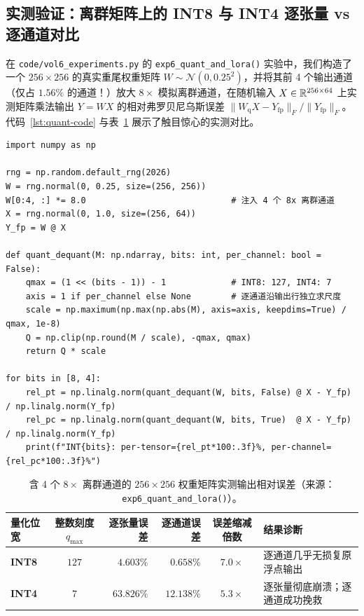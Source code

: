 \subsection{实测验证：离群矩阵上的 INT8 与 INT4 逐张量 vs 逐通道对比}

在 \texttt{code/vol6\_experiments.py} 的 \texttt{exp6\_quant\_and\_lora()} 实验中，我们构造了一个 $256 \times 256$ 的真实重尾权重矩阵 $W \sim \mathcal{N}(0, 0.25^2)$，并将其前 4 个输出通道（仅占 $1.56\%$ 的通道！）放大 $8\times$ 模拟离群通道，在随机输入 $X \in \mathbb{R}^{256\times 64}$ 上实测矩阵乘法输出 $Y = W X$ 的相对弗罗贝尼乌斯误差 $\|W_{\mathrm{q}} X - Y_{\mathrm{fp}}\|_F / \|Y_{\mathrm{fp}}\|_F$。代码~\ref{lst:quant-code} 与表~\ref{tab:quant-exp} 展示了触目惊心的实测对比。

\begin{lstlisting}[caption={对称均匀量化（逐张量 vs 逐通道）在重尾离群权重矩阵上的实测核验脚本。},label={lst:quant-code}]
import numpy as np

rng = np.random.default_rng(2026)
W = rng.normal(0, 0.25, size=(256, 256))
W[0:4, :] *= 8.0                             # 注入 4 个 8x 离群通道
X = rng.normal(0, 1.0, size=(256, 64))
Y_fp = W @ X

def quant_dequant(M: np.ndarray, bits: int, per_channel: bool = False):
    qmax = (1 << (bits - 1)) - 1             # INT8: 127, INT4: 7
    axis = 1 if per_channel else None        # 逐通道沿输出行独立求尺度
    scale = np.maximum(np.max(np.abs(M), axis=axis, keepdims=True) / qmax, 1e-8)
    Q = np.clip(np.round(M / scale), -qmax, qmax)
    return Q * scale

for bits in [8, 4]:
    rel_pt = np.linalg.norm(quant_dequant(W, bits, False) @ X - Y_fp) / np.linalg.norm(Y_fp)
    rel_pc = np.linalg.norm(quant_dequant(W, bits, True)  @ X - Y_fp) / np.linalg.norm(Y_fp)
    print(f"INT{bits}: per-tensor={rel_pt*100:.3f}%, per-channel={rel_pc*100:.3f}%")
\end{lstlisting}

\begin{table}[htbp]
\centering
\caption{含 4 个 $8\times$ 离群通道的 $256\times 256$ 权重矩阵实测输出相对误差（来源：\texttt{exp6\_quant\_and\_lora()}）。}
\label{tab:quant-exp}
\small
\begin{tabular}{@{}lcrrcl@{}}
\toprule
\textbf{量化位宽} & \textbf{整数刻度 $q_{\max}$} & \textbf{逐张量误差} & \textbf{逐通道误差} & \textbf{误差缩减倍数} & \textbf{结果诊断} \\
\midrule
\textbf{INT8} & $127$ & $4.603\%$ & $\mathbf{0.658\%}$ & $\mathbf{7.0\times}$ & 逐通道几乎无损复原浮点输出 \\
\textbf{INT4} & $7$ & $63.826\%$ & $\mathbf{12.138\%}$ & $\mathbf{5.3\times}$ & 逐张量彻底崩溃；逐通道成功挽救 \\
\bottomrule
\end{tabular}
\end{table}


